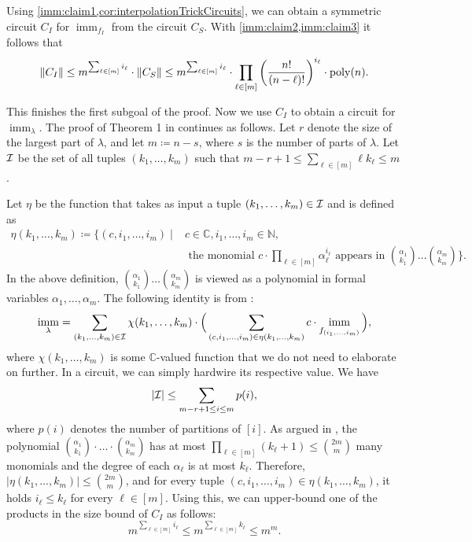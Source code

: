 \documentclass[10pt,a4paper]{article}
\theoremstyle{definition}
\theoremstyle{plain}
\theoremstyle{remark}
\DeclarePairedDelimiter{\norm}{\lVert}{\rVert}
\newcommand{\Ii}{{\cal I}}
\newcommand{\bbN}{\mathbb{N}}
\DeclareMathOperator{\imm}{imm}
\begin{document}
Using \cref{imm:claim1,cor:interpolationTrickCircuits}, we can obtain a symmetric circuit $C_I$ for $\imm_{f_I}$ from the circuit $C_S$. With \cref{imm:claim2,imm:claim3} it follows that 
\[
\norm{C_I} \leq m^{\sum_{\ell \in [m]} i_\ell} \cdot \norm{C_S} \leq  m^{\sum_{\ell \in [m]} i_\ell} \cdot \prod_{\ell \in [m]} \left(\frac{n!}{(n-\ell)!} \right)^{i_\ell} \cdot \operatorname{poly}(n).
\]

This finishes the first subgoal of the proof. Now we use $C_I$ to obtain a circuit for $\imm_{\lambda}$.
The proof of Theorem 1 in \cite{hartmann1985complexity} continues as follows. Let $r$ denote the size of the largest part of $\lambda$, and let $m \coloneqq n-s$, where $s$ is the number of parts of $\lambda$.
Let $\Ii$ be the set of all tuples $(k_1,\dots ,k_m)$ such that $m-r+1 \leq \sum_{\ell \in [m]} \ell k_\ell \leq m$.

 
Let $\eta$ be the function that takes as input a tuple $(k_1,\dots ,k_m) \in \Ii$ and is defined as
\begin{align*}
\eta(k_1,\dots ,k_m) \coloneqq \Big\{ (c,i_1,\dots ,i_m) \mid &c \in \mathbb{C}, i_1,\dots ,i_m \in \bbN,\\
 &\text{ the monomial } c\cdot \prod_{\ell \in [m]} \alpha_\ell^{i_\ell}  \text{ appears in }  \binom{\alpha_1}{k_1} \dots   \binom{\alpha_m}{k_m} \Big\}.
\end{align*}
In the above definition,  $\binom{\alpha_1}{k_1} \dots  \binom{\alpha_m}{k_m}$ is viewed as a polynomial in formal variables $\alpha_1,\dots ,\alpha_m$.
The following identity is from \cite{hartmann1985complexity}:
\begin{align}
\imm_{\lambda} = \sum_{(k_1,\dots ,k_m) \in \Ii} \chi(k_1,\dots ,k_m) \cdot \Big( \sum_{(c,i_1,\dots ,i_m) \in \eta(k_1,\dots ,k_m)}  c \cdot \imm_{f_{(i_1,\dots ,i_m)}} \Big),\label{eq:star1}
\end{align}
where $\chi(k_1,\dots ,k_m)$ is some $\mathbb{C}$-valued function that we do not need to elaborate on further. In a circuit, we can simply hardwire its respective value.
We have 
\[
| \Ii | \leq \sum_{m-r+1\leq i \leq m} p(i),
\]
where $p(i)$ denotes the number of partitions of $[i]$.
As argued in \cite{hartmann1985complexity}, the polynomial $\binom{\alpha_1}{k_1}\cdot \dots  \cdot \binom{\alpha_m}{k_m}$ has at most $\prod_{\ell \in [m]} (k_\ell+1) \leq \binom{2m}{m}$ many monomials and the degree of each $\alpha_\ell$ is at most $k_\ell$.
Therefore, $|\eta(k_1,\dots ,k_m)| \leq \binom{2m}{m}$, and for every tuple $(c,i_1,\dots ,i_m) \in \eta(k_1,\dots ,k_m)$, it holds $i_\ell \leq k_\ell$ for every $\ell \in [m]$. Using this, we can upper-bound one of the products in the size bound of $C_I$ as follows:
\[
m^{\sum_{\ell \in [m]} i_\ell} \leq m^{\sum_{\ell \in [m]} k_\ell} \leq m^m.
\]	
\end{document}

